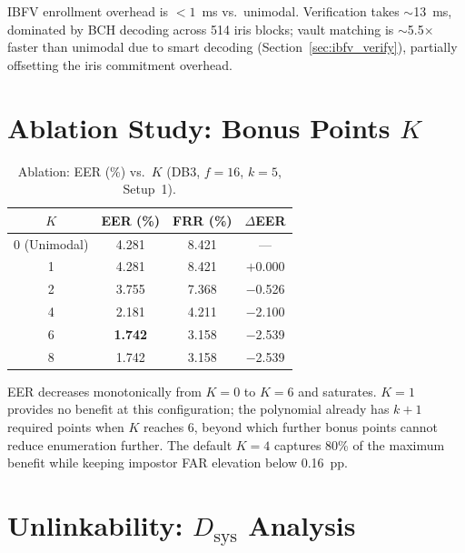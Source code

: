 IBFV enrollment overhead is $< 1$~ms vs.\ unimodal. Verification takes $\sim$13~ms,
dominated by BCH decoding across 514 iris blocks; vault matching is $\sim$5.5$\times$
faster than unimodal due to smart decoding (Section~\ref{sec:ibfv_verify}),
partially offsetting the iris commitment overhead.

\section{Ablation Study: Bonus Points $K$}
\label{sec:ablation}

\begin{table}[h]
\centering
\caption{Ablation: EER (\%) vs.\ $K$ (DB3, $f=16$, $k=5$, Setup~1).}
\label{tab:ablation}
\small
\begin{tabular}{@{}cccc@{}}
\toprule
$K$ & EER (\%) & FRR (\%) & $\Delta$EER \\
\midrule
0 (Unimodal) & 4.281 & 8.421 & --- \\
1            & 4.281 & 8.421 & $+$0.000 \\
2            & 3.755 & 7.368 & $-$0.526 \\
4            & 2.181 & 4.211 & $-$2.100 \\
6            & \textbf{1.742} & 3.158 & $-$2.539 \\
8            & 1.742 & 3.158 & $-$2.539 \\
\bottomrule
\end{tabular}
\end{table}

EER decreases monotonically from $K=0$ to $K=6$ and saturates. $K=1$ provides no
benefit at this configuration; the polynomial already has $k+1$ required points when
$K$ reaches 6, beyond which further bonus points cannot reduce enumeration further.
The default $K=4$ captures 80\% of the maximum benefit while keeping impostor FAR
elevation below 0.16~pp.

\section{Unlinkability: $D_{\mathrm{sys}}$ Analysis}
\label{sec:dsys_results}


